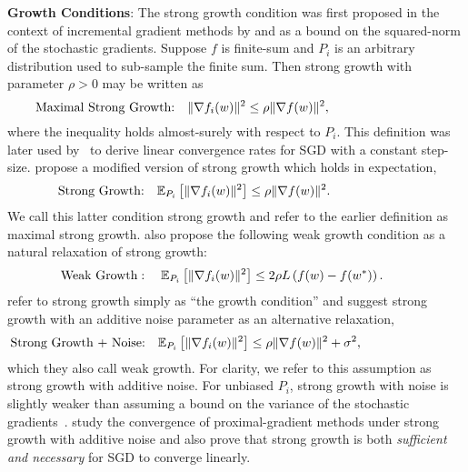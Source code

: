 \noindent \textbf{Growth Conditions}:
The strong growth condition was first proposed in the context of incremental gradient methods by \citet{solodov1998incremental} and \citet{tseng1998incremental} as a bound on the squared-norm of the stochastic gradients.
Suppose \( f \) is finite-sum and \( P_i \) is an arbitrary distribution used to sub-sample the finite sum. 
    Then strong growth with parameter \( \rho > 0 \) may be written as 
\[ \text{Maximal Strong Growth:} \quad \|\nabla f_i(w)\|^2 \leq \rho \|\nabla f(w)\|^2, \hspace{8.5em} \]
where the inequality holds almost-surely with respect to \( P_i \).
This definition was later used by~\citet{schmidt2013fast} to derive linear convergence rates for \ac{SGD} with a constant step-size. 
\citet{vaswani2019fast} propose a modified version of strong growth which holds in expectation,
\[ \text{Strong Growth:} \quad \mathbb{E}_{P_i} \left[\|\nabla f_i(w)\|^2\right] \leq \rho \|\nabla f(w)\|^2. \hspace{6.6em} \]
We call this latter condition strong growth and refer to the earlier definition as maximal strong growth.
\citet{vaswani2019fast} also propose the following weak growth condition as a natural relaxation of strong growth: 
\[ \text{Weak Growth}: \quad \mathbb{E}_{P_i}\left[\|\nabla f_i(w)\|^2\right] \leq 2 \rho L \left(f(w) - f(w^*)\right). \hspace{2.2em} \]
\citet{cevher2018linear} refer to strong growth simply as ``the growth condition'' and suggest strong growth with an additive noise parameter as an alternative relaxation, 
\[ \text{Strong Growth + Noise:} \quad \mathbb{E}_{P_i} \left[\|\nabla f_i(w)\|^2\right] \leq \rho \|\nabla f(w)\|^2 + \sigma^2, \hspace{8em} \]
which they also call weak growth.
For clarity, we refer to this assumption as strong growth with additive noise.
For unbiased \( P_i \), strong growth with noise is slightly weaker than assuming a bound on the variance of the stochastic gradients~\citep{khaled2020better, ghadimi2012optimal1}.
\citet{cevher2018linear} study the convergence of proximal-gradient methods under strong growth with additive noise and also prove that strong growth is both \emph{sufficient and necessary} for \ac{SGD} to converge linearly.\\


